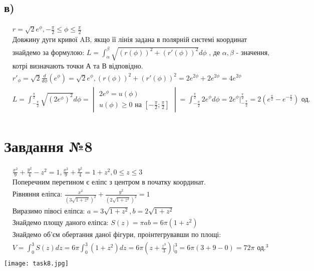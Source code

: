 \documentclass{report}
\begin{document}
\subsection{в)}
\begin{equation}\label{eq2_c}\begin{split}
	& r = \sqrt{2}e^{\phi}, -\frac{\pi}{2} \leq \phi \leq \frac{\pi}{2}\\
	& \text{Довжину дуги кривої AB, якщо її лінія задана в полярній системі координат} \\
	& \text{знайдемо за формулою: } L = \int_\alpha^\beta \sqrt{(r(\phi))^2 + (r'(\phi))^2} d\phi \text{ , де } \alpha, \beta \text{ - значення,}\\
	& \text{котрі визначають точки А та В відповідно.}\\
	& r'_{\phi} = \sqrt{2}\frac{d}{d\phi}(e^{\phi}) = \sqrt{2}e^{\phi}, (r(\phi))^2 + (r'(\phi))^2 = 2e^{2\phi} + 2e^{2\phi} = 4e^{2\phi}\\
	& L = \int_{-\frac{\pi}{2}}^{\frac{\pi}{2}} \sqrt{(2e^\phi)^2}d\phi = \begin{vmatrix}2e^\phi = u(\phi)\\ u(\phi) \geq 0 \text{ на } [-\frac{\pi}{2}; \frac{\pi}{2}]\end{vmatrix} = \int_{-\frac{\pi}{2}}^{\frac{\pi}{2}} 2e^\phi d\phi = 2e^\phi|_{-\frac{\pi}{2}}^{\frac{\pi}{2}} = 2(e^{\frac{\pi}{2}} - e^{-\frac{\pi}{2}}) \text{ од.}\\
\end{split}\end{equation}

\section{Завдання №8}
\begin{equation}\label{eq4}\begin{split}
	& \frac{x^2}{9} + \frac{y^2}{4} - z^2 = 1, \frac{x^2}{9} + \frac{y^2}{4} = 1 + z^2, 0 \leq z \leq 3\\
	& \text{Поперечним перетином є еліпс з центром в початку координат.}\\
	& \text{Рівняння еліпса: }\frac{x^2}{(3\sqrt{1 + z^2})^2} + \frac{y^2}{(2\sqrt{1 + z^2})^2} = 1\\
	& \text{Виразимо півосі еліпса: } a = 3\sqrt{1 + z^2}, b = 2\sqrt{1 + z^2}\\
	& \text{Знайдемо площу даного еліпса: } S(z) = \pi ab = 6\pi(1 + z^2)\\
	& \text{Знайдемо об'єм обертання даної фігури, проінтегрувавши по площі: }\\
	& V = \int_0^3 S(z)dz = 6\pi\int_0^3(1 + z^2)dz = 6\pi\left(z + \frac{z^3}{3}\right)\bigg|_0^3 = 6\pi(3 + 9 - 0) = 72\pi \text{ од.}^3\\
\end{split}\end{equation}
\texttt{[image: task8.jpg]}
\end{document}
